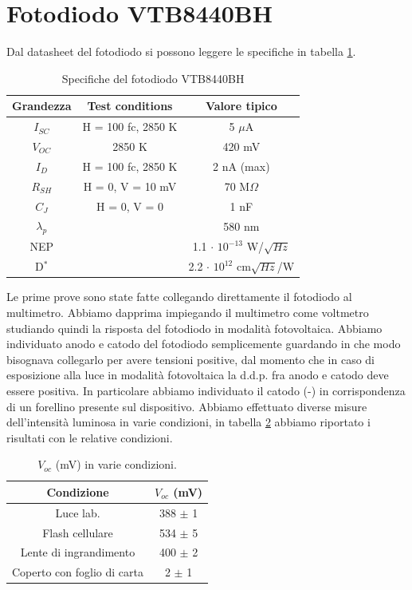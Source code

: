 \documentclass[journal, a4paper]{IEEEtran}
\begin{document}
\section{Fotodiodo VTB8440BH}

Dal datasheet del fotodiodo si possono leggere le specifiche in tabella \ref{tab:spec}.

\begin{table}[htp]
\centering
\caption{Specifiche del fotodiodo VTB8440BH}
\label{tab:spec}
\begin{tabular}{|c|c|c|}
\hline 
Grandezza & Test conditions & Valore tipico \\ 
\hline 
$I_{SC}$ & H = 100 fc, 2850 K & 5 $\mu$A \\ 
\hline 
$V_{OC}$ & 2850 K & 420 mV \\ 
\hline 
$I_D$ & H = 100 fc, 2850 K & 2 nA (max) \\ 
\hline 
$R_{SH}$ & H = 0, V = 10 mV & 70 M$\Omega$ \\ 
\hline 
$C_J$ & H = 0, V = 0 & 1 nF \\ 
\hline 
$\lambda _p$ &  & 580 nm \\ 
\hline 
NEP &  & 1.1 $\cdot$ $10^{-13}$ W/$\sqrt{Hz}$ \\ 
\hline 
D$^*$ &  & 2.2 $\cdot$ $10^{12}$ cm$\sqrt{Hz}$/W \\ 
\hline 
\end{tabular} 
\end{table}

Le prime prove sono state fatte collegando direttamente il fotodiodo al multimetro. Abbiamo dapprima impiegando il multimetro come voltmetro studiando quindi la risposta del fotodiodo in modalità fotovoltaica. Abbiamo individuato anodo e catodo del fotodiodo semplicemente guardando in che modo bisognava collegarlo per avere tensioni positive, dal momento che in caso di esposizione alla luce in modalità fotovoltaica la d.d.p. fra anodo e catodo deve essere positiva. In particolare abbiamo individuato il catodo (-) in corrispondenza di un forellino presente sul dispositivo. Abbiamo effettuato diverse misure dell'intensità luminosa in varie condizioni, in tabella \ref{tab:ill} abbiamo riportato i risultati con le relative condizioni.

\begin{table}[htp]
\centering
\caption{$V_{oc}$ (mV) in varie condizioni.}
\label{tab:ill}
\begin{tabular}{|c|c|}
\hline 
Condizione & $V_{oc}$ (mV) \\ 
\hline 
Luce lab. & 388 $\pm$ 1 \\ 
\hline 
Flash cellulare & 534 $\pm$ 5 \\ 
\hline 
Lente di ingrandimento & 400 $\pm$ 2 \\ 
\hline
Coperto con foglio di carta & 2 $\pm$ 1 \\ 
\hline  
\end{tabular} 
\end{table}
\end{document}
